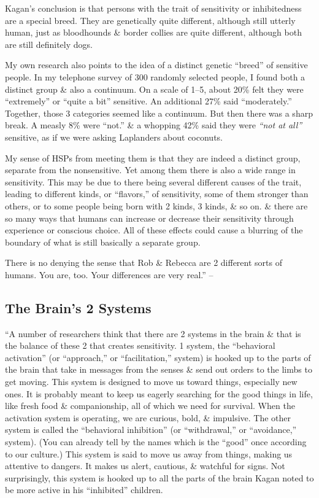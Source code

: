 \documentclass{article}
\numberwithin{equation}{section}
\begin{document}
Kagan's conclusion is that persons with the trait of sensitivity or inhibitedness are a special breed. They are genetically quite different, although still utterly human, just as bloodhounds \& border collies are quite different, although both are still definitely dogs.

My own research also points to the idea of a distinct genetic ``breed'' of sensitive people. In my telephone survey of 300 randomly selected people, I found both a distinct group \& also a continuum. On a scale of 1--5, about 20\% felt they were ``extremely'' or ``quite a bit'' sensitive. An additional 27\% said ``moderately.'' Together, those 3 categories seemed like a continuum. But then there was a sharp break. A measly 8\% were ``not.'' \& a whopping 42\% said they were \textit{``not at all''} sensitive, as if we were asking Laplanders about coconuts.

My sense of HSPs from meeting them is that they are indeed a distinct group, separate from the nonsensitive. Yet among them there is also a wide range in sensitivity. This may be due to there being several different causes of the trait, leading to different kinds, or ``flavors,'' of sensitivity, some of them stronger than others, or to some people being born with 2 kinds, 3 kinds, \& so on. \& there are so many ways that humans can increase or decrease their sensitivity through experience or conscious choice. All of these effects could cause a blurring of the boundary of what is still basically a separate group.

There is no denying the sense that Rob \& Rebecca are 2 different sorts of humans. You are, too. Your differences are very real.'' -- \cite[pp. 61--63]{Aron2013}

\subsection{The Brain's 2 Systems}
``A number of researchers think that there are 2 systems in the brain \& that is the balance of these 2 that creates sensitivity. 1 system, the ``behavioral activation'' (or ``approach,'' or ``facilitation,'' system) is hooked up to the parts of the brain that take in messages from the senses \& send out orders to the limbs to get moving. This system is designed to move us toward things, especially new ones. It is probably meant to keep us eagerly searching for the good things in life, like fresh food \& companionship, all of which we need for survival. When the activation system is operating, we are curious, bold, \& impulsive. The other system is called the ``behavioral inhibition'' (or ``withdrawal,'' or ``avoidance,'' system). (You can already tell by the names which is the ``good'' once according to our culture.) This system is said to move us away from things, making us attentive to dangers. It makes us alert, cautious, \& watchful for signs. Not surprisingly, this system is hooked up to all the parts of the brain Kagan noted to be more active in his ``inhibited'' children.
\end{document}
